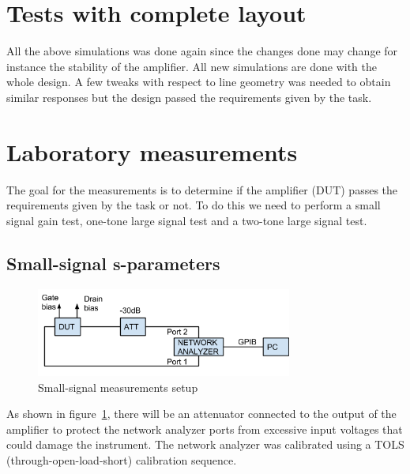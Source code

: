   \section{Tests with complete layout}
  All the above simulations was done again since the changes done may change for instance the stability of the amplifier. All new simulations are done with the whole design. A few tweaks with respect to line geometry was needed to obtain similar responses but the design passed the requirements given by the task.
  \section{Laboratory measurements}
  The goal for the measurements is to determine if the amplifier (DUT) passes the requirements given by the task or not. To do this we need to perform a small signal gain test, one-tone large signal test and a two-tone large signal test.
  \subsection{Small-signal s-parameters}
	\begin{figure}[h]
	  \centering
	  \includegraphics[width=0.75\textwidth]{img/Small_signal_meas}
	  \caption{Small-signal measurements setup}
	  \label{fig:fig_small_meas}
    \end{figure}
	As shown in figure~\ref{fig:fig_small_meas}, there will be an attenuator connected to the output of the amplifier to protect the network analyzer ports from excessive input voltages that could damage the instrument. The network analyzer was calibrated using a TOLS (through-open-load-short) calibration sequence.
  
